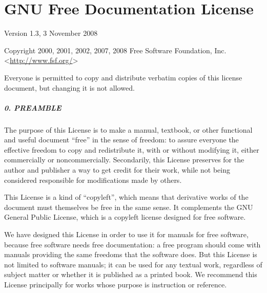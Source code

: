 \documentclass[10pt,]{book}
\theoremstyle{plain}
\theoremstyle{definition}
\theoremstyle{definition}
\theoremstyle{definition}
\numberwithin{equation}{chapter}
\begin{document}
\chapter[{GNU Free Documentation License}]{GNU Free Documentation License}\label{appendix-gfdl}
\hypertarget{p-2759}{}%
Version 1.3, 3 November 2008%
\par
\hypertarget{p-2760}{}%
Copyright \textcopyright{} 2000, 2001, 2002, 2007, 2008 Free Software Foundation, Inc. \textless{}\url{http://www.fsf.org/}\textgreater{}%
\par
\hypertarget{p-2761}{}%
Everyone is permitted to copy and distribute verbatim copies of this license document, but changing it is not allowed.%
\typeout{************************************************}
\typeout{************************************************}
\paragraph[{0. PREAMBLE}]{0. PREAMBLE}\hypertarget{gfdl-section0}{}
\hypertarget{p-2762}{}%
The purpose of this License is to make a manual, textbook, or other functional and useful document ``free'' in the sense of freedom: to assure everyone the effective freedom to copy and redistribute it, with or without modifying it, either commercially or noncommercially. Secondarily, this License preserves for the author and publisher a way to get credit for their work, while not being considered responsible for modifications made by others.%
\par
\hypertarget{p-2763}{}%
This License is a kind of ``copyleft'', which means that derivative works of the document must themselves be free in the same sense. It complements the GNU General Public License, which is a copyleft license designed for free software.%
\par
\hypertarget{p-2764}{}%
We have designed this License in order to use it for manuals for free software, because free software needs free documentation: a free program should come with manuals providing the same freedoms that the software does. But this License is not limited to software manuals; it can be used for any textual work, regardless of subject matter or whether it is published as a printed book. We recommend this License principally for works whose purpose is instruction or reference.%
\typeout{************************************************}
\typeout{************************************************}
\end{document}
